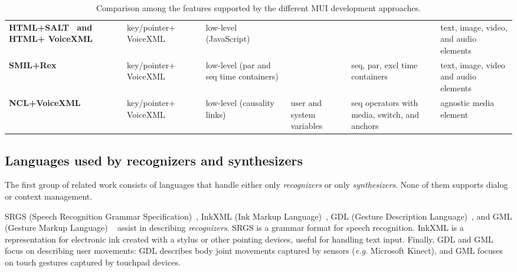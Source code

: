 \begin{landscape}
\begin{table}
\begin{tabular}[]{ m{4cm}|m{3cm} m{3cm} m{3cm} m{3cm} m{3cm} m{3cm}}
	\hline
	\rowcolor[HTML]{F2F2F2} \multicolumn{7}{c}{Multimedia languages}\\
	\hline

	\textbf{HTML+SALT~\cite{wang_salt:_2002} and HTML+ VoiceXML~\cite{w3c_xhtml+voice_2001}} & key/pointer+
	VoiceXML & &
	low-level (JavaScript) & & & text, image, video, and audio elements\\
	\textbf{SMIL+Rex~\cite{beckham_towards_2001}} & key/pointer+ VoiceXML & & low-level (par and seq
	time
	containers) & & seq, par, excl time containers & text, image, video and
	audio elements\\
	\textbf{NCL+VoiceXML~\cite{carvalho_estendendo_2010}} & key/pointer+ VoiceXML & & low-level (causality
	links) & user and system variables & seq operators with media, switch, and
	anchors & agnostic media element\\
	\hline

\end{tabular}
\caption{Comparison among the features supported by the different MUI
development approaches.}
\label{table:state}
\end{table}
\end{landscape}

\subsection{Languages used by recognizers and synthesizers}
\label{sec:state:monomodal}

The first group of related work consists of languages that handle either only
\textit{recognizers} or only \textit{synthesizers}. None of them supports dialog
or context management.

SRGS (Speech Recognition Grammar Specification)~\cite{andrew_hunt_speech_2004},
InkXML (Ink Markup Language)~\cite{w3c_ink_2011}, GDL (Gesture Description
Language)~\cite{hachaj_semantic_2012}, and GML (Gesture Markup Language)
~\cite{ideum_inc_gesture_2016} assist in describing \textit{recognizers}. SRGS
is a grammar format for speech recognition. InkXML is a representation for
electronic ink created with a stylus or other pointing devices, useful for
handling text input. Finally, GDL and GML focus on describing user movements:
GDL describes body joint movements captured by sensors (\textit{e.g.} Microsoft Kinect),
and GML focuses on touch gestures captured by touchpad devices.

